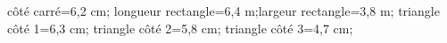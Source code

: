 \documentclass[exercice]{thedocument}%
\begin{document}
%
    \>côté carré=6,2 cm;%
    \>longueur rectangle=6,4 m;\>largeur rectangle=3,8 m;%
    \>triangle côté 1=6,3 cm;%
    \>triangle côté 2=5,8 cm;%
    \>triangle côté 3=4,7 cm;%
\end{document}

